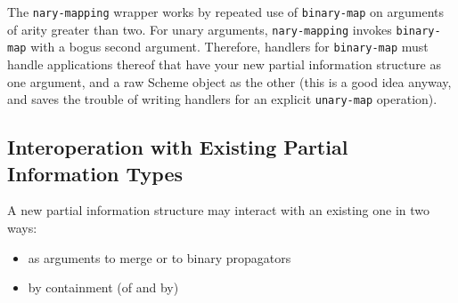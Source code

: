 \documentclass[12pt,letterpaper,english]{article}
\begin{document}
The \texttt{nary-mapping} wrapper works by repeated use of \texttt{binary-map}
on arguments of arity greater than two.  For unary arguments,
\texttt{nary-mapping} invokes \texttt{binary-map} with a bogus second argument.
Therefore, handlers for \texttt{binary-map} must handle
applications thereof that have your new partial information structure
as one argument, and a raw Scheme object as the other (this is a good
idea anyway, and saves the trouble of writing handlers for an explicit
\texttt{unary-map} operation).



\hypertarget{interoperation-with-existing-partial-information-types}{}
\subsection{Interoperation with Existing Partial Information Types}
\label{interoperation-with-existing-partial-information-types}

A new partial information structure may interact with an existing one
in two ways:
\begin{itemize}
\item {} 
as arguments to merge or to binary propagators

\item {} 
by containment (of and by)

\end{itemize}
\end{document}
